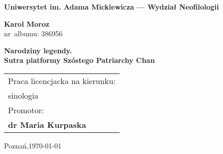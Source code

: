 \begin{titlepage}%
  \begin{center}%
    {\large \textbf{Uniwersytet im. Adama Mickiewicza --- Wydział Neofilologii}\par}
    \par
  \end{center}%
   \vspace{1cm plus 1fill}
  \begin{flushleft}%
    {{\Large\bfseries Karol Moroz}\\
    nr~albumu: 386956\par}
  \end{flushleft}%
   \vspace{8mm plus 1mm minus 2mm}
  \begin{center}%
    {\huge\textbf{Narodziny legendy.\\Sutra platformy Szóstego Patriarchy Chan}\par}
    \vspace{2cm plus 1.5fill}
    \begin{flushright}\large
      \begin{tabular}{l}
        Praca licencjacka na kierunku:\\[3pt]
        sinologia\\[3pt]
        Promotor: \\[3pt]
        \bfseries dr Maria Kurpaska
      \end{tabular}
    \end{flushright}
    \vspace{15mm plus .1fill}
    {\large Poznań,\space \today\par}
  \end{center}
\end{titlepage}%
